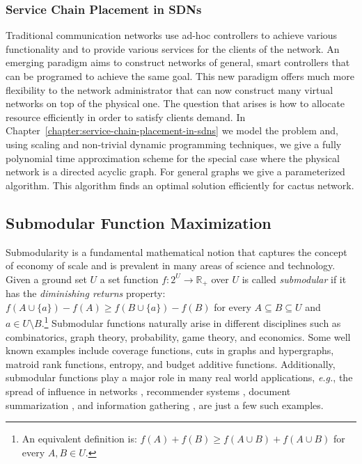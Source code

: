 \subsubsection*{Service Chain Placement in SDNs} 
Traditional communication networks use ad-hoc controllers to achieve various functionality and to provide various services for the clients of the network.
An emerging paradigm aims to construct networks of general, smart controllers that can be programed to achieve the same goal. 
This new paradigm offers much more flexibility to the network administrator that can now construct many virtual networks on top of the physical one.
The question that arises is how to allocate resource efficiently in order to satisfy clients demand.
In Chapter~\ref{chapter:service-chain-placement-in-sdns} we model the problem and, using scaling and non-trivial dynamic programming techniques, we give a fully polynomial time approximation scheme for the special case where the physical network is a directed acyclic graph. 
For general graphs we give a parameterized algorithm.
This algorithm finds an optimal solution efficiently for cactus network.

\subsection*{Submodular Function Maximization}
Submodularity is a fundamental mathematical notion that captures the concept of economy of scale and is prevalent in many areas of science and technology.
Given a ground set $U$ a set function $f:2^U \to \mathbb{R}_+$ over $U$ is called \emph{submodular} if it has the \emph{diminishing returns} property:
$f(A \cup \{a\}) - f(A) \geq f(B \cup \{a\}) - f(B)$ for every $A \subseteq B \subseteq U$ and $a \in U \setminus B$.\footnote{
    An equivalent definition is: $f(A) + f(B) \geq f(A \cup B) + f(A \cup B)$ for every $A,B \in U$.
}
Submodular functions naturally arise in different disciplines such as combinatorics, graph theory, probability, game theory, and economics.
Some well known examples include coverage functions, cuts in graphs and hypergraphs, matroid rank functions, entropy, and budget additive functions.
Additionally, submodular functions play a major role in many real world applications, {\em e.g.}, the spread of influence in networks \cite{KKT03,KKT05,KKT15,MR10}, recommender systems \cite{EG11,EVSG09}, document summarization \cite{DKR13,LB10,LB11}, and information gathering \cite{GKS05,KG11,KGGK06,KGGK11,KSG08}, are just a few such examples.

